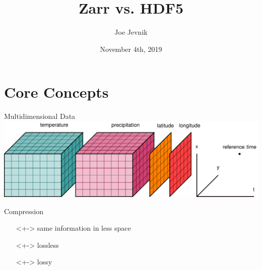 \documentclass{beamer}
\title{Zarr vs. HDF5}
\date{November 4th, 2019}
\author{Joe Jevnik}
\institute{PyData NYC 2019}
\begin{document}
\maketitle

\newcommand{\zarr}{\texttt{zarr}}

\section{Core Concepts}

\begin{frame}{Multidimensional Data}
  \includegraphics[width=1.00\textwidth]{images/multidimensional-data.png}
\end{frame}

\begin{frame}{Compression}
  \begin{itemize}
  \item[]<+-> same information in less space
  \item[]<+-> lossless
  \item[]<+-> lossy
  \end{itemize}
\end{frame}
\end{document}
